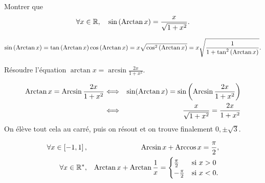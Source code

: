 \documentclass{magnolia}
\begin{document}
\begin{exos}
\exo Montrer que 
  \[\forall x\in\mathbb{R} ,\quad \sin\left(\operatorname{Arctan} x\right)=\frac{x}{\sqrt{1+x^2}}.\]
  \begin{sol}
  $$\sin\left(\operatorname{Arctan} x\right)=\tan\left(\operatorname{Arctan} x\right)\cos\left(\operatorname{Arctan} x\right)=x\sqrt{\cos^2\left(\operatorname{Arctan} x\right)}=x\sqrt{\frac{1}{1+\tan^2\left(\operatorname{Arctan} x\right)}}.$$
  \end{sol}
\exo Résoudre l'équation $\arctan x=\arcsin\frac{2x}{1+x^2}$.
  \begin{sol}
  \begin{eqnarray*}
  \operatorname{Arctan} x=\operatorname{Arcsin}\frac{2x}{1+x^2}&\Longleftrightarrow & \sin(\operatorname{Arctan} x)=\sin\left(\operatorname{Arcsin}\frac{2x}{1+x^2}\right)\\
  &\Longleftrightarrow & \frac{x}{\sqrt{1+x^2}}=\frac{2x}{1+x^2}
  \end{eqnarray*}
  On élève tout cela au carré, puis on résout et on trouve finalement $0,\pm\sqrt{3}$.
  \end{sol}
\end{exos}

\begin{proposition}[utile=-3]
\begin{eqnarray*}
\forall x\in\left[-1,1\right], & & \operatorname{Arcsin} x+\operatorname{Arccos} x=\frac{\pi}{2},\\
\forall x\in{\mathbb{R}^*}, & & \operatorname{Arctan} x+\operatorname{Arctan}\frac{1}{x}=
  \begin{cases}
  \frac{\pi}{2} & \text{si $x>0$}\\
  -\frac{\pi}{2} & \text{si $x<0$.} 
  \end{cases}
\end{eqnarray*}
\end{proposition}
\end{document}
